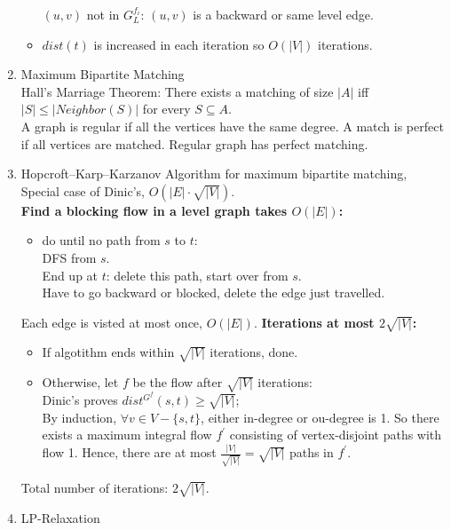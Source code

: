 \documentclass[10pt, a4paper, twocolumn]{article}
\begin{document}
\begin{enumerate}[leftmargin = 12pt, topsep = 0pt, itemsep=0pt, partopsep = 0pt]
\begin{itemize}[leftmargin = 12pt, topsep = 0pt, itemsep=0pt, partopsep = 0pt]
            $(u,v)$ not in $G^{f_i}_L$: $(u,v)$ is a backward or same level edge.
        \item $dist(t)$ is increased in each iteration so $O(|V|)$ iterations.
        \end{itemize}
    \item Maximum Bipartite Matching\\
        Hall's Marriage Theorem: There exists a matching of size $|A|$ iff $|S|\leq |Neighbor(S)|$ for every $S\subseteq A$.\\
        A graph is regular if all the vertices have the same degree.  A match is perfect if all vertices are matched. Regular graph has perfect matching.
    \item Hopcroft–Karp–Karzanov Algorithm for maximum bipartite         matching, Special case of Dinic's, $O(|E|\cdot\sqrt{|V|})$.\\
        \textbf{Find a blocking flow in a level graph takes $O(|E|)$:}
        \begin{itemize}[leftmargin = 12pt, topsep = 0pt, itemsep=0pt, partopsep = 0pt]
        \item do until no path from $s$ to $t$:\\
            DFS from $s$.\\
            End up at $t$: delete this path, start over from $s$.\\
            Have to go backward or blocked, delete the edge just travelled.
        \end{itemize}
        Each edge is visted at most once, $O(|E|)$.
        \textbf{Iterations at most $2\sqrt{|V|}$:}
        \begin{itemize}[leftmargin = 12pt, topsep = 0pt, itemsep=0pt, partopsep = 0pt]
        \item If algotithm ends within $\sqrt{|V|}$ iterations, done.
        \item Otherwise, let $f$ be the flow after $\sqrt{|V|}$ iterations:\\
            Dinic's proves $dist^{G^f}(s,t)\geq \sqrt{|V|}$; \\
            By induction, $\forall v\in V- \{s,t\}$, either in-degree or ou-degree is 1.
            So there exists a maximum integral flow $f^{'}$ consisting of
            vertex-disjoint paths with flow 1.
            Hence, there are at most $\frac{|V|}{\sqrt{|V|}}=\sqrt{|V|}$ paths in $f^{'}$.
        \end{itemize}
        Total number of iterations: $2\sqrt{|V|}$.
    \item LP-Relaxation\\

\end{enumerate}
\end{document}
